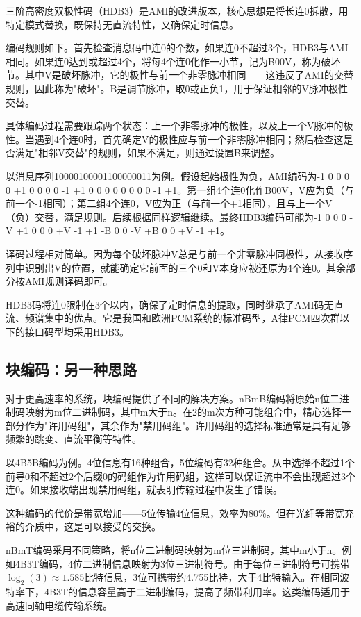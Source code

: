 三阶高密度双极性码（HDB3）是AMI的改进版本，核心思想是将长连0拆散，用特定模式替换，既保持无直流特性，又确保定时信息。

编码规则如下。首先检查消息码中连0的个数，如果连0不超过3个，HDB3与AMI相同。如果连0达到或超过4个，将每4个连0化作一小节，记为B00V，称为破坏节。其中V是破坏脉冲，它的极性与前一个非零脉冲相同——这违反了AMI的交替规则，因此称为"破坏"。B是调节脉冲，取0或正负1，用于保证相邻的V脉冲极性交替。

具体编码过程需要跟踪两个状态：上一个非零脉冲的极性，以及上一个V脉冲的极性。当遇到4个连0时，首先确定V的极性应与前一个非零脉冲相同；然后检查这是否满足"相邻V交替"的规则，如果不满足，则通过设置B来调整。

以消息序列10000100001100000011为例。假设起始极性为负，AMI编码为-1 0 0 0 0 +1 0 0 0 0 -1 +1 0 0 0 0 0 0 0 0 -1 +1。第一组4个连0化作B00V，V应为负（与前一个-1相同）；第二组4个连0，V应为正（与前一个+1相同），且与上一个V（负）交替，满足规则。后续根据同样逻辑继续。最终HDB3编码可能为-1 0 0 0 -V +1 0 0 0 +V -1 +1 -B 0 0 -V +B 0 0 +V -1 +1。

译码过程相对简单。因为每个破坏脉冲V总是与前一个非零脉冲同极性，从接收序列中识别出V的位置，就能确定它前面的三个0和V本身应被还原为4个连0。其余部分按AMI规则译码即可。

HDB3码将连0限制在3个以内，确保了定时信息的提取，同时继承了AMI码无直流、频谱集中的优点。它是我国和欧洲PCM系统的标准码型，A律PCM四次群以下的接口码型均采用HDB3。

\subsection{块编码：另一种思路}

对于更高速率的系统，块编码提供了不同的解决方案。nBmB编码将原始n位二进制码映射为m位二进制码，其中m大于n。在2的m次方种可能组合中，精心选择一部分作为"许用码组"，其余作为"禁用码组"。许用码组的选择标准通常是具有足够频繁的跳变、直流平衡等特性。

以4B5B编码为例。4位信息有16种组合，5位编码有32种组合。从中选择不超过1个前导0和不超过2个后缀0的码组作为许用码组，这样可以保证流中不会出现超过3个连0。如果接收端出现禁用码组，就表明传输过程中发生了错误。

这种编码的代价是带宽增加——5位传输4位信息，效率为80\%。但在光纤等带宽充裕的介质中，这是可以接受的交换。

nBmT编码采用不同策略，将n位二进制码映射为m位三进制码，其中m小于n。例如4B3T编码，4位二进制信息映射为3位三进制符号。由于每位三进制符号可携带$\log_2(3) \approx 1.585$比特信息，3位可携带约4.755比特，大于4比特输入。在相同波特率下，4B3T的信息容量高于二进制编码，提高了频带利用率。这类编码适用于高速同轴电缆传输系统。

